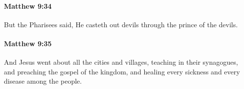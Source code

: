 		\paragraph{Matthew 9:34} %
			\label{MATTHEW-9-34}

			But the Pharisees said, He casteth out devils through the prince of the devils.

			\begin{framed}
			\scriptsize
				\begin{compactdesc}
					\item[SBLG] 
				\end{compactdesc}
			\end{framed}

		\paragraph{Matthew 9:35} %
			\label{MATTHEW-9-35}

			And Jesus went about all the cities and villages, teaching in their synagogues, and preaching the gospel of the kingdom, and healing every sickness and every disease among the people.

